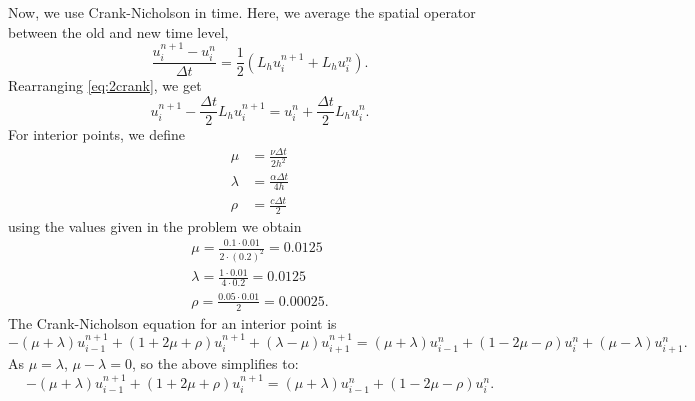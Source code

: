 \begin{derivation}
    Now, we use Crank-Nicholson in time.
    Here, we average the spatial operator between the old and new time level,
    \begin{equation} \label{eq:2crank}
      \frac{u_i^{n+1} - u_i^{n}}{\Delta t} = \frac{1}{2} \left( L_h u_i^{n+1} + L_h u_i^{n} \right)
    .\end{equation}
    Rearranging \cref{eq:2crank}, we get
    \begin{equation*}
      u_i^{n+1}- \frac{\Delta t}{2}L_h u_i^{n+1} = u_i^{n} + \frac{\Delta t}{2} L_h u_i^{n}
    .\end{equation*}
    For interior points, we define
    \begin{align}
      \mu &= \frac{\nu \Delta t}{2h^2} \\
      \lambda &= \frac{\alpha \Delta t}{4h} \\
      \rho &= \frac{c \Delta t}{2}
    \end{align}
    using the values given in the problem we obtain
    \begin{gather*}
      \mu = \frac{\num{0,1} \cdot \num{0,01} }{2 \cdot \left( \num{0,2}  \right)^2} = \num{0,0125} \\
      \lambda = \frac{1 \cdot \num{0,01} }{4 \cdot \num{0,2} } = \num{0,0125} \\
      \rho = \frac{\num{0,05} \cdot \num{0,01} }{2} = \num{0,00025} 
    .\end{gather*}
    The Crank-Nicholson equation for an interior point is
    \begin{equation}
      - \left( \mu + \lambda \right)u_{i-1}^{n+1} + \left( 1 + 2\mu + \rho \right)u_i^{n+1} + \left( \lambda - \mu \right)u_{i+1}^{n+1} = \left( \mu + \lambda \right)u_{i-1}^{n} + \left( 1 - 2\mu - \rho \right)u_i^{n} + \left( \mu - \lambda \right)u_{i+1}^{n}
    .\end{equation}
    As $\mu = \lambda$, $\mu - \lambda = 0$, so the above simplifies to:
    \begin{equation}
      - \left( \mu + \lambda \right)u_{i-1}^{n+1} + \left( 1 + 2\mu + \rho \right)u_i^{n+1} = \left( \mu + \lambda \right)u_{i-1}^{n} + \left( 1 - 2\mu - \rho \right)u_i^{n}
    .\end{equation}
  \end{derivation}

